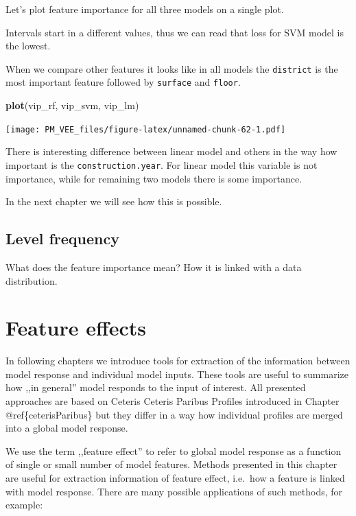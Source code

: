 \documentclass[12pt,]{krantz}
\newenvironment{Shaded}{\begin{snugshade}}{\end{snugshade}}
\newcommand{\KeywordTok}[1]{\textcolor[rgb]{0.13,0.29,0.53}{\textbf{#1}}}
\newcommand{\NormalTok}[1]{#1}
\theoremstyle{definition}
\theoremstyle{definition}
\theoremstyle{definition}
\theoremstyle{remark}
\begin{document}
Let's plot feature importance for all three models on a single plot.

Intervals start in a different values, thus we can read that loss for
SVM model is the lowest.

When we compare other features it looks like in all models the
\texttt{district} is the most important feature followed by
\texttt{surface} and \texttt{floor}.

\begin{Shaded}
\begin{Highlighting}[]
\KeywordTok{plot}\NormalTok{(vip_rf, vip_svm, vip_lm)}
\end{Highlighting}
\end{Shaded}

\texttt{[image: PM\_VEE\_files/figure-latex/unnamed-chunk-62-1.pdf]}

There is interesting difference between linear model and others in the
way how important is the \texttt{construction.year}. For linear model
this variable is not importance, while for remaining two models there is
some importance.

In the next chapter we will see how this is possible.

\hypertarget{level-frequency}{%
\subsection{Level frequency}\label{level-frequency}}

What does the feature importance mean? How it is linked with a data
distribution.

\hypertarget{featureEffects}{%
\section{Feature effects}\label{featureEffects}}

In following chapters we introduce tools for extraction of the
information between model response and individual model inputs. These
tools are useful to summarize how ,,in general'' model responds to the
input of interest. All presented approaches are based on Ceteris Ceteris
Paribus Profiles introduced in Chapter @ref\{ceterisParibus\} but they
differ in a way how individual profiles are merged into a global model
response.

We use the term ,,feature effect'' to refer to global model response as
a function of single or small number of model features. Methods
presented in this chapter are useful for extraction information of
feature effect, i.e.~how a feature is linked with model response. There
are many possible applications of such methods, for example:
\end{document}
